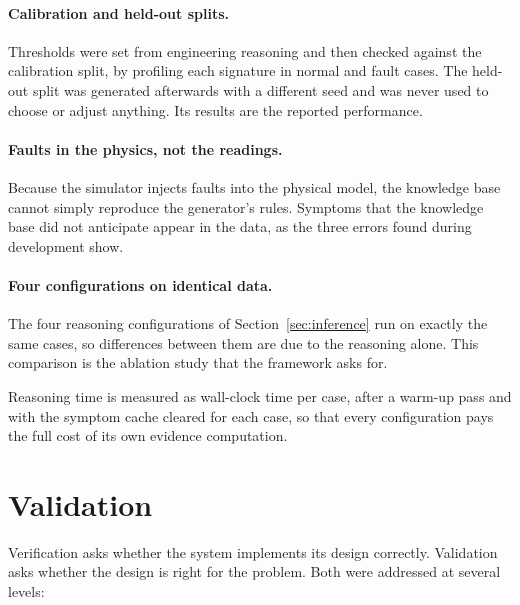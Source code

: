 \paragraph{Calibration and held-out splits.} Thresholds were set from engineering reasoning and then checked against the calibration split, by profiling each signature in normal and fault cases. The held-out split was generated afterwards with a different seed and was never used to choose or adjust anything. Its results are the reported performance.

\paragraph{Faults in the physics, not the readings.} Because the simulator injects faults into the physical model, the knowledge base cannot simply reproduce the generator's rules. Symptoms that the knowledge base did not anticipate appear in the data, as the three errors found during development show.

\paragraph{Four configurations on identical data.} The four reasoning configurations of Section~\ref{sec:inference} run on exactly the same cases, so differences between them are due to the reasoning alone. This comparison is the ablation study that the framework asks for.

Reasoning time is measured as wall-clock time per case, after a warm-up pass and with the symptom cache cleared for each case, so that every configuration pays the full cost of its own evidence computation.

\section{Validation}
\label{sec:validation}

Verification asks whether the system implements its design correctly. Validation asks whether the design is right for the problem. Both were addressed at several levels:

